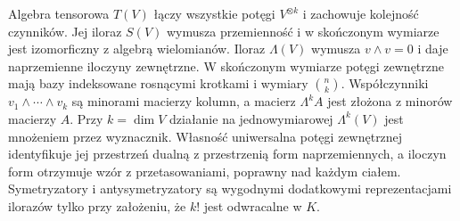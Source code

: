Algebra tensorowa \(T(V)\)
łączy wszystkie potęgi
\(V^{\otimes k}\) i zachowuje
kolejność czynników.
Jej iloraz \(S(V)\) wymusza
przemienność i w skończonym
wymiarze jest izomorficzny
z algebrą wielomianów.
Iloraz \(\Lambda(V)\) wymusza
\(v\wedge v=0\) i daje
naprzemienne iloczyny zewnętrzne.
W skończonym wymiarze
potęgi zewnętrzne mają bazy
indeksowane rosnącymi krotkami
i wymiary \(\binom nk\).
Współczynniki
\(v_1\wedge\cdots\wedge v_k\)
są minorami macierzy kolumn,
a macierz \(\Lambda^k A\)
jest złożona z minorów
macierzy \(A\).
Przy \(k=\dim V\) działanie
na jednowymiarowej
\(\Lambda^k(V)\) jest mnożeniem
przez wyznacznik.
Własność uniwersalna
potęgi zewnętrznej
identyfikuje jej przestrzeń dualną z
przestrzenią form naprzemiennych,
a iloczyn form otrzymuje
wzór z przetasowaniami,
poprawny nad każdym ciałem.
Symetryzatory i antysymetryzatory
są wygodnymi dodatkowymi
reprezentacjami ilorazów
tylko przy założeniu, że
\(k!\) jest odwracalne w \(K\).
